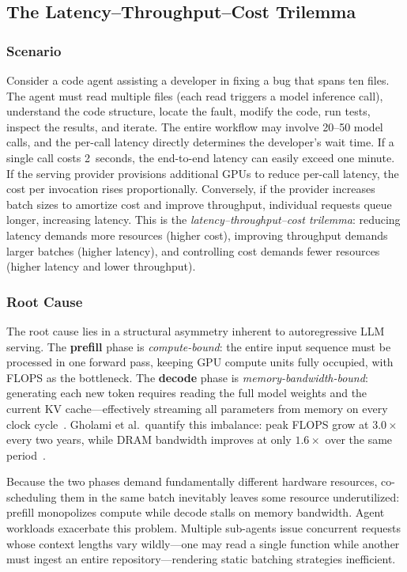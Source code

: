 \documentclass[11pt,a4paper]{article}
\begin{document}
\subsection{The Latency--Throughput--Cost Trilemma}

\subsubsection{Scenario}
Consider a code agent assisting a developer in fixing a bug that spans ten files.
The agent must read multiple files (each read triggers a model inference call), understand the code structure, locate the fault, modify the code, run tests, inspect the results, and iterate.
The entire workflow may involve 20--50 model calls, and the per-call latency directly determines the developer's wait time.
If a single call costs 2~seconds, the end-to-end latency can easily exceed one minute.
If the serving provider provisions additional GPUs to reduce per-call latency, the cost per invocation rises proportionally.
Conversely, if the provider increases batch sizes to amortize cost and improve throughput, individual requests queue longer, increasing latency.
This is the \emph{latency--throughput--cost trilemma}: reducing latency demands more resources (higher cost), improving throughput demands larger batches (higher latency), and controlling cost demands fewer resources (higher latency and lower throughput).

\subsubsection{Root Cause}
The root cause lies in a structural asymmetry inherent to autoregressive LLM serving.
The \textbf{prefill} phase is \emph{compute-bound}: the entire input sequence must be processed in one forward pass, keeping GPU compute units fully occupied, with FLOPS as the bottleneck.
The \textbf{decode} phase is \emph{memory-bandwidth-bound}: generating each new token requires reading the full model weights and the current KV cache---effectively streaming all parameters from memory on every clock cycle~\cite{gholami2024memorywall}.
Gholami et al.\ quantify this imbalance: peak FLOPS grow at $3.0\times$ every two years, while DRAM bandwidth improves at only $1.6\times$ over the same period~\cite{gholami2024memorywall}.

Because the two phases demand fundamentally different hardware resources, co-scheduling them in the same batch inevitably leaves some resource underutilized: prefill monopolizes compute while decode stalls on memory bandwidth.
Agent workloads exacerbate this problem.
Multiple sub-agents issue concurrent requests whose context lengths vary wildly---one may read a single function while another must ingest an entire repository---rendering static batching strategies inefficient.
\end{document}
